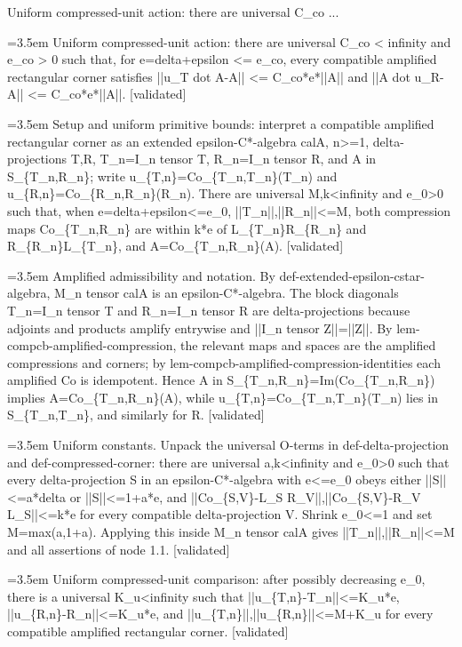 \documentclass{article}
\newcommand{\step}[1]{\par\noindent\hangindent=3.5em\hangafter=1%
  \makebox[3.5em][l]{\textbf{#1.}}}
\newcommand{\steptag}[1]{\hfill{\small\textsf{[#1]}}}
\begin{document}
\begin{proofbox}{Uniform compressed-unit action: there are universal C\_co ...}
\step{1} Uniform compressed-unit action: there are universal C\_co < infinity and e\_co > 0 such that, for e=delta+epsilon <= e\_co, every compatible amplified rectangular corner satisfies ||u\_T dot A-A|| <= C\_co*e*||A|| and ||A dot u\_R-A|| <= C\_co*e*||A||. \steptag{validated} \\[6pt]
\step{1.1} Setup and uniform primitive bounds: interpret a compatible amplified rectangular corner as an extended epsilon-C*-algebra calA, n>=1, delta-projections T,R, T\_n=I\_n tensor T, R\_n=I\_n tensor R, and A in S\_\{T\_n,R\_n\}; write u\_\{T,n\}=Co\_\{T\_n,T\_n\}(T\_n) and u\_\{R,n\}=Co\_\{R\_n,R\_n\}(R\_n). There are universal M,k<infinity and e\_0>0 such that, when e=delta+epsilon<=e\_0, ||T\_n||,||R\_n||<=M, both compression maps Co\_\{T\_n,R\_n\} are within k*e of L\_\{T\_n\}R\_\{R\_n\} and R\_\{R\_n\}L\_\{T\_n\}, and A=Co\_\{T\_n,R\_n\}(A). \steptag{validated} \\[6pt]
\step{1.1.1} Amplified admissibility and notation. By def-extended-epsilon-cstar-algebra, M\_n tensor calA is an epsilon-C*-algebra. The block diagonals T\_n=I\_n tensor T and R\_n=I\_n tensor R are delta-projections because adjoints and products amplify entrywise and ||I\_n tensor Z||=||Z||. By lem-compcb-amplified-compression, the relevant maps and spaces are the amplified compressions and corners; by lem-compcb-amplified-compression-identities each amplified Co is idempotent. Hence A in S\_\{T\_n,R\_n\}=Im(Co\_\{T\_n,R\_n\}) implies A=Co\_\{T\_n,R\_n\}(A), while u\_\{T,n\}=Co\_\{T\_n,T\_n\}(T\_n) lies in S\_\{T\_n,T\_n\}, and similarly for R. \steptag{validated} \\[4pt]
\step{1.1.2} Uniform constants. Unpack the universal O-terms in def-delta-projection and def-compressed-corner: there are universal a,k<infinity and e\_0>0 such that every delta-projection S in an epsilon-C*-algebra with e<=e\_0 obeys either ||S||<=a*delta or ||S||<=1+a*e, and ||Co\_\{S,V\}-L\_S R\_V||,||Co\_\{S,V\}-R\_V L\_S||<=k*e for every compatible delta-projection V. Shrink e\_0<=1 and set M=max(a,1+a). Applying this inside M\_n tensor calA gives ||T\_n||,||R\_n||<=M and all assertions of node 1.1. \steptag{validated} \\[4pt]
\step{1.2} Uniform compressed-unit comparison: after possibly decreasing e\_0, there is a universal K\_u<infinity such that ||u\_\{T,n\}-T\_n||<=K\_u*e, ||u\_\{R,n\}-R\_n||<=K\_u*e, and ||u\_\{T,n\}||,||u\_\{R,n\}||<=M+K\_u for every compatible amplified rectangular corner. \steptag{validated} \\[6pt]

\end{proofbox}
\end{document}
